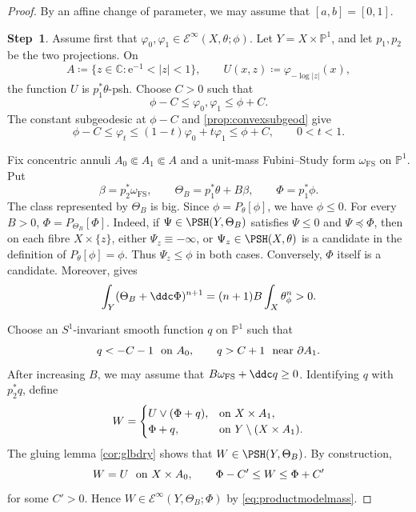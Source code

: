 \begin{proof}
    By an affine change of parameter, we may assume that $[a,b]=[0,1]$.

    \textbf{Step~1}. Assume first that $\varphi_0,\varphi_1\in \mathcal{E}^{\infty}(X,\theta;\phi)$. Let $Y=X\times\mathbb{P}^1$, and let $p_1,p_2$ be the two projections. On
    \[
        A\coloneqq\{z\in\mathbb{C}:\mathrm{e}^{-1}<|z|<1\},
        \qquad U(x,z)\coloneqq\varphi_{-\log|z|}(x),
    \]
    the function $U$ is $p_1^*\theta$-psh. Choose $C>0$ such that
    \[
        \phi-C\leq \varphi_0,\varphi_1\leq\phi+C.
    \]
    The constant subgeodesic at $\phi-C$ and \cref{prop:convexsubgeod} give
    \begin{equation}\label{eq:relgeoduniformbound}
        \phi-C\leq\varphi_t\leq(1-t)\varphi_0+t\varphi_1\leq\phi+C,
        \qquad 0<t<1.
    \end{equation}

    Fix concentric annuli $A_0\Subset A_1\Subset A$ and a unit-mass Fubini--Study form $\omega_{\mathrm{FS}}$ on $\mathbb{P}^1$. Put
    \[
        \beta=p_2^*\omega_{\mathrm{FS}},\qquad
        \Theta_B=p_1^*\theta+B\beta,\qquad
        \Phi=p_1^*\phi.
    \]
    The class represented by $\Theta_B$ is big. Since $\phi=P_\theta[\phi]$, we have $\phi\leq0$. For every $B>0$, $\Phi=P_{\Theta_B}[\Phi]$. Indeed, if $\Psi\in\PSH(Y,\Theta_B)$ satisfies $\Psi\leq0$ and $\Psi\preceq\Phi$, then on each fibre $X\times\{z\}$, either $\Psi_z\equiv-\infty$, or $\Psi_z\in\PSH(X,\theta)$ is a candidate in the definition of $P_\theta[\phi]=\phi$. Thus $\Psi_z\leq\phi$ in both cases. Conversely, $\Phi$ itself is a candidate. Moreover,  gives
    \begin{equation}\label{eq:productmodelmass}
        \int_Y(\Theta_B+\ddc\Phi)^{n+1}
        =(n+1)B\int_X\theta_\phi^n>0.
    \end{equation}

    Choose an $S^1$-invariant smooth function $q$ on $\mathbb{P}^1$ such that
    \[
        q<-C-1\ \textup{ on }A_0,
        \qquad q>C+1\ \textup{ near }\partial A_1.
    \]
    After increasing $B$, we may assume that $B\omega_{\mathrm{FS}}+\ddc q\geq0$. Identifying $q$ with $p_2^*q$, define
    \[
        W=
        \begin{cases}
            U\lor(\Phi+q),&\textup{on }X\times A_1,\\
            \Phi+q,&\textup{on }Y\setminus(X\times A_1).
        \end{cases}
    \]
    The gluing lemma \cref{cor:glbdry} shows that $W\in\PSH(Y,\Theta_B)$. By construction,
    \begin{equation}\label{eq:compactgluedpotential}
        W=U\ \textup{ on }X\times A_0,
        \qquad \Phi-C'\leq W\leq\Phi+C'
    \end{equation}
    for some $C'>0$. Hence $W\in\mathcal{E}^{\infty}(Y,\Theta_B;\Phi)$ by \eqref{eq:productmodelmass}.


\end{proof}
